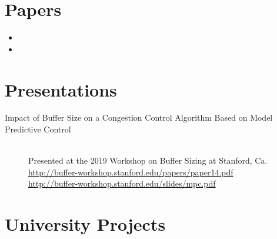 \documentclass{resume}
\begin{document}
\section*{Papers}

\begin{itemize}
\item {}

\item {}
\end{itemize}

\section*{Presentations}

\begin{description}
    \item[Impact of Buffer Size on a Congestion Control Algorithm Based on Model Predictive Control]
        \hfill\\
        Presented at the 2019 Workshop on Buffer Sizing at Stanford, Ca.\\
        \url{http://buffer-workshop.stanford.edu/papers/paper14.pdf}\\
        \url{http://buffer-workshop.stanford.edu/slides/mpc.pdf}
\end{description}


\section*{University Projects}
\end{document}
